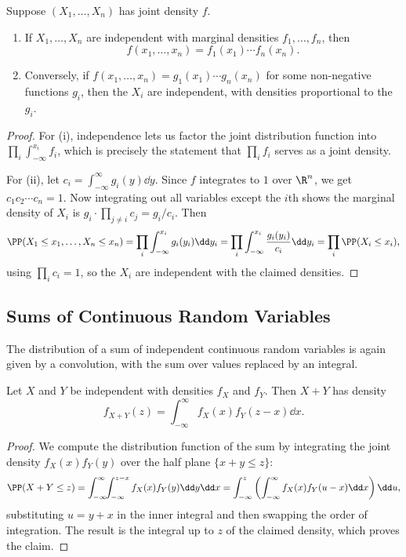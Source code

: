\begin{theorem}
	Suppose $(X_1, \dots, X_n)$ has joint density $f$.
	\begin{enumerate}[label=(\roman*)]
		\item If $X_1, \dots, X_n$ are independent with marginal densities $f_1, \dots, f_n$, then
		$$
		f(x_1, \dots, x_n) = f_1(x_1)\cdots f_n(x_n).
		$$
		\item Conversely, if $f(x_1, \dots, x_n) = g_1(x_1) \cdots g_n(x_n)$ for some non-negative functions $g_i$, then the $X_i$ are independent, with densities proportional to the $g_i$.
	\end{enumerate}
\end{theorem}
\begin{proof}
	For (i), independence lets us factor the joint distribution function into $\prod_i \int_{-\infty}^{x_i} f_i$, which is precisely the statement that $\prod_i f_i$ serves as a joint density.

	For (ii), let $c_i = \int_{-\infty}^{\infty} g_i(y)\dd y$. Since $f$ integrates to $1$ over $\R^n$, we get $c_1 c_2 \cdots c_n = 1$. Now integrating out all variables except the $i$th shows the marginal density of $X_i$ is $g_i \cdot \prod_{j \neq i} c_j = g_i / c_i$. Then
	$$
	\PP(X_1 \leq x_1, \dots, X_n \leq x_n) = \prod_{i} \int_{-\infty}^{x_i} g_i(y_i) \dd y_i = \prod_i \int_{-\infty}^{x_i} \frac{g_i(y_i)}{c_i}\dd y_i = \prod_i \PP(X_i \leq x_i),
	$$
	using $\prod_i c_i = 1$, so the $X_i$ are independent with the claimed densities.
\end{proof}

\subsection{Sums of Continuous Random Variables}

The distribution of a sum of independent continuous random variables is again given by a convolution, with the sum over values replaced by an integral.

\begin{proposition}[Convolution]
	Let $X$ and $Y$ be independent with densities $f_X$ and $f_Y$. Then $X + Y$ has density
	$$
	f_{X + Y}(z) = \int_{-\infty}^{\infty} f_X(x) f_Y(z - x) \dd x.
	$$
\end{proposition}
\begin{proof}
	We compute the distribution function of the sum by integrating the joint density $f_X(x)f_Y(y)$ over the half plane $\{x + y \leq z\}$:
	$$
	\PP(X + Y \leq z) = \int_{-\infty}^{\infty} \!\!\int_{-\infty}^{z - x} f_X(x)f_Y(y)\dd y \dd x = \int_{-\infty}^{z}\left(\int_{-\infty}^{\infty} f_X(x)f_Y(u - x)\dd x \right)\dd u,
	$$
	substituting $u = y + x$ in the inner integral and then swapping the order of integration. The result is the integral up to $z$ of the claimed density, which proves the claim.
\end{proof}

